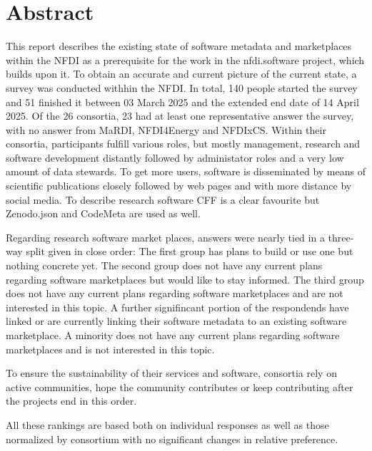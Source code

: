 \documentclass[headsepline,titlepage,twoside,12pt,toc=flat,headings=normal]{scrreprt}
\author{\theauthor}
\date{\thedate}
\title{\thetitle}
\subtitle{Deliverable 2.2}
\begin{document}
\maketitle
\imprint

\chapter*{Abstract}\label{ch:abstract}

This report describes the existing state of software metadata and marketplaces within the NFDI as a prerequisite for the work in the nfdi.software project, which builds upon it.
To obtain an accurate and current picture of the current state, a survey was conducted withhin the NFDI.
In total, 140 people started the survey and 51 finished it between 03 March 2025 and the extended end date of 14 April 2025.
Of the 26 consortia, 23 had at least one representative answer the survey, with no answer from MaRDI, NFDI4Energy and NFDIxCS.
Within their consortia, participants fulfill various roles, but mostly management, research and software development distantly followed by administator roles and a very low amount of data stewards.
To get more users, software is disseminated by means of scientific publications closely followed by web pages and with more distance by social media.
To describe research software \ac{CFF} is a clear favourite but Zenodo.json and CodeMeta are used as well.

Regarding research software market places, answers were nearly tied in a three-way split given in close order:
The first group has plans to build or use one but nothing concrete yet.
The second group does not have any current plans regarding software marketplaces but would like to stay informed.
The third group does not have any current plans regarding software marketplaces and are not interested in this topic.
A further signifincant portion of the respondends have linked or are currently linking their software metadata to an existing software marketplace.
A minority does not have any current plans regarding software marketplaces and is not interested in this topic.

To ensure the sustainability of their services and software, consortia rely on active communities, hope the community contributes or keep contributing after the projects end in this order.

All these rankings are based both on individual responses as well as those normalized by consortium with no significant changes in relative preference.
\end{document}
